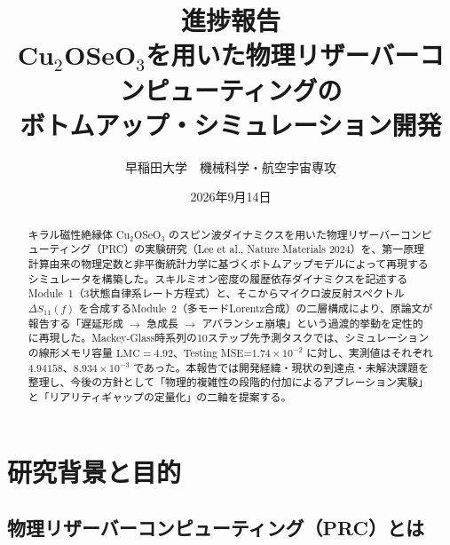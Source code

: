 \documentclass[11pt,a4paper]{ltjsarticle}
\title{\LARGE 進捗報告\\[6pt]
\Large Cu$_2$OSeO$_3$を用いた物理リザーバーコンピューティングの\\
ボトムアップ・シミュレーション開発}
\author{早稲田大学　機械科学・航空宇宙専攻}
\date{2026年9月14日}
\begin{document}
\maketitle

\begin{abstract}
\noindent
キラル磁性絶縁体 Cu$_2$OSeO$_3$ のスピン波ダイナミクスを用いた物理リザーバーコンピューティング（PRC）の実験研究（Lee et al., Nature Materials 2024）を、第一原理計算由来の物理定数と非平衡統計力学に基づくボトムアップモデルによって再現するシミュレータを構築した。スキルミオン密度の履歴依存ダイナミクスを記述するModule~1（3状態自律系レート方程式）と、そこからマイクロ波反射スペクトル $\Delta S_{11}(f)$ を合成するModule~2（多モードLorentz合成）の二層構成により、原論文が報告する「遅延形成 $\rightarrow$ 急成長 $\rightarrow$ アバランシェ崩壊」という過渡的挙動を定性的に再現した。Mackey-Glass時系列の10ステップ先予測タスクでは、シミュレーションの線形メモリ容量 $\mathrm{LMC}=4.92$、Testing MSE=$1.74\times10^{-2}$ に対し、実測値はそれぞれ $4.94158$、$8.934\times10^{-3}$ であった。本報告では開発経緯・現状の到達点・未解決課題を整理し、今後の方針として「物理的複雑性の段階的付加によるアブレーション実験」と「リアリティギャップの定量化」の二軸を提案する。
\end{abstract}


\tableofcontents
\newpage

\section{研究背景と目的}

\subsection{物理リザーバーコンピューティング（PRC）とは}
\end{document}
